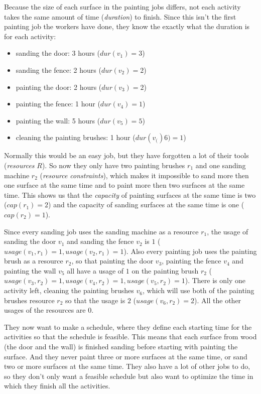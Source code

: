 \documentclass{article}
\newcommand{\capa}[1]{\ensuremath{cap(r_{#1})}} %
\newcommand{\dur}[1]{\ensuremath{dur(v_{#1})}} %
\newcommand{\usage}[2]{\ensuremath{usage(v_{#1}, r_{#2})}} %
\begin{document}
Because the size of each surface in the painting jobs differs, not each activity takes the same amount of time (\emph{duration}) to finish.
Since this isn't the first painting job the workers have done, they know the exactly what the duration is for each activity:
\begin{itemize}
\item sanding the door: 3 hours ($\dur{1} = 3$)
\item sanding the fence: 2 hours ($\dur{2} = 2$)
\item painting the door: 2 hours ($\dur{3} = 2$)
\item painting the fence: 1 hour ($\dur{4} = 1$)
\item painting the wall: 5 hours ($\dur{5} = 5$)
\item cleaning the painting brushes: 1 hour ($\dur(6) = 1$)
\end{itemize}
Normally this would be an easy job, but they have forgotten a lot of their tools (\emph{resources} $R$).
So now they only have two painting brushes $r_1$ and one sanding machine $r_2$ (\emph{resource constraints}), which makes it impossible to sand more then one surface at the same time and to paint more then two surfaces at the same time.
This shows us that the \emph{capacity} of painting surfaces at the same time is two ($\capa{1} = 2$) and the capacity of sanding surfaces at the same time is one  ($\capa{2} = 1$).

Since every sanding job uses the sanding machine as a resource $r_1$, the usage of sanding the door $v_1$ and sanding the fence $v_2$ is $1$ ($\usage{1}{1} = 1, \usage{2}{1} = 1$).
Also every painting job uses the painting brush as a resource $r_2$, so that painting the door $v_3$, painting the fence $v_4$ and painting the wall $v_5$ all have a usage of $1$ on the painting brush $r_2$ ($\usage{3}{2} = 1, \usage{4}{2} = 1, \usage{5}{2} = 1$).
There is only one activity left, cleaning the painting brushes $v_6$, which will use both of the painting brushes resource $r_2$ so that the usage is $2$ ($\usage{6}{2} = 2$). All the other usages of the resources are $0$.

They now want to make a schedule, where they define each starting time for the activities so that the schedule is feasible.
This means that each surface from wood (the door and the wall) is finished sanding before starting with painting the surface.
And they never paint three or more surfaces at the same time, or sand two or more surfaces at the same time.
They also have a lot of other jobs to do, so they don't only want a feasible schedule but also want to optimize the time in which they finish all the activities.
\end{document}
